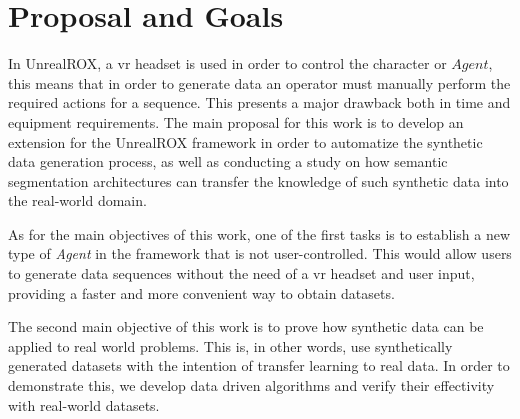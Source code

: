 \section{Proposal and Goals}
\label{sec:goals}
In UnrealROX, a \gls{vr} headset is used in order to control the character or $Agent$, this means that in order to generate data an operator must manually perform the required actions for a sequence. This presents a major drawback both in time and equipment requirements.
The main proposal for this work is to develop an extension for the UnrealROX framework in order to automatize the synthetic data generation process, as well as conducting a study on how semantic segmentation architectures can transfer the knowledge of such synthetic data into the real-world domain.

As for the main objectives of this work, one of the first tasks is to establish a new type of \textit{Agent} in the framework that is not user-controlled. This would allow users to generate data sequences without the need of a \gls{vr} headset and user input, providing a faster and more convenient way to obtain datasets.

The second main objective of this work is to prove how synthetic data can be applied to real world problems. This is, in other words, use synthetically generated datasets with the intention of transfer learning to real data. In order to demonstrate this, we develop data driven algorithms and verify their effectivity with real-world datasets.

